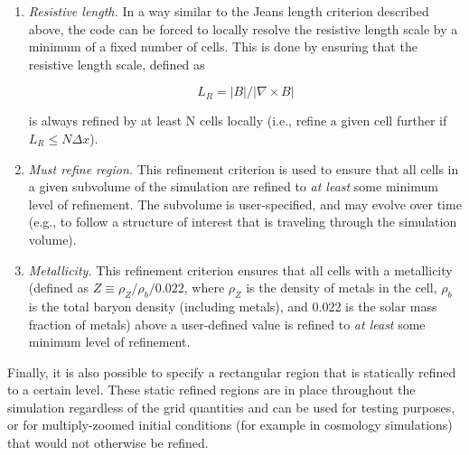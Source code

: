 \begin{enumerate}
\item{\em Resistive length.}  In a way similar to the Jeans length criterion described above, the code can be forced to locally resolve the resistive length scale by a minimum of a fixed number of cells.  This is done by ensuring that the resistive length scale, defined as

\begin{equation}
L_R = |B| / |\nabla \times B|
\end{equation}

is always refined by at least N cells locally (i.e., refine a given cell further if $L_R \leq N \Delta x$).

\item{\em Must refine region.}  This refinement criterion is used to ensure that all cells in a given subvolume of the simulation are refined to {\it at least} some minimum level of refinement.  The subvolume is user-specified, and may evolve over time (e.g., to follow a structure of interest that is traveling through the simulation volume).

\item{\em Metallicity.}  This refinement criterion ensures that all cells with a metallicity (defined as $Z \equiv \rho_{Z} / \rho_{b} / 0.022$, where $\rho_{Z}$ is the density of metals in the cell, $\rho_{b}$ is the total baryon density (including metals), and 0.022 is the solar mass fraction of metals) above a user-defined value is refined to {\it at least} some minimum level of refinement. 

\end{enumerate}

Finally, it is also possible to specify a rectangular region that is statically refined to a certain level.  These static refined regions are in place throughout the simulation regardless of the grid quantities and can be used for testing purposes, or for multiply-zoomed initial conditions (for example in cosmology simulations) that would not otherwise be refined.

%

